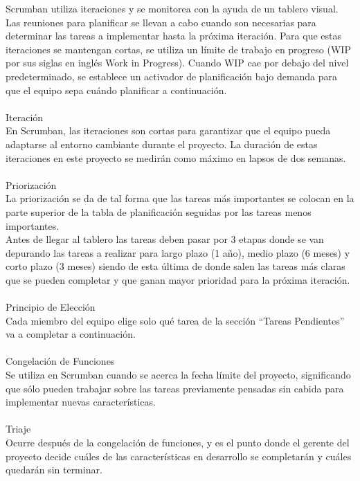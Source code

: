 \documentclass[12pt, a4paper, titlepage]{report}
\begin{document}
	    Scrumban utiliza iteraciones y se monitorea con la ayuda de un tablero visual. Las reuniones para planificar se llevan a cabo cuando son necesarias para determinar las tareas a implementar hasta la próxima iteración. Para que estas iteraciones se mantengan cortas, se utiliza un límite de trabajo en progreso (WIP por sus siglas en inglés Work in Progress). Cuando WIP cae por debajo del nivel predeterminado, se establece un activador de planificación bajo demanda para que el equipo sepa cuándo planificar a continuación.\\
	    \\
	    Iteración\\
	    En Scrumban, las iteraciones son cortas para garantizar que el equipo pueda adaptarse al entorno cambiante durante el proyecto. La duración de estas iteraciones en este proyecto se medirán como máximo en lapsos de dos semanas.\\
	    \\
	    Priorización\\
	    La priorización se da de tal forma que las tareas más importantes se colocan en la parte superior de la tabla de planificación seguidas por las tareas menos importantes.\\
	    Antes de llegar al tablero las tareas deben pasar por 3 etapas donde se van depurando las tareas a realizar para largo plazo (1 año), medio plazo (6 meses) y corto plazo (3 meses) siendo de esta última de donde salen las tareas más claras que se pueden completar y que ganan mayor prioridad para la próxima iteración.\\
	    \\
	    Principio de Elección\\
	    Cada miembro del equipo elige solo qué tarea de la sección “Tareas Pendientes” va a completar a continuación.\\
	    \\
	    Congelación de Funciones\\
	    Se utiliza en Scrumban cuando se acerca la fecha límite del proyecto, significando que sólo pueden trabajar sobre las tareas previamente pensadas sin cabida para implementar nuevas características.\\
	    \\
	    Triaje\\
	    Ocurre después de la congelación de funciones, y es el punto donde el gerente del proyecto decide cuáles de las características en desarrollo se completarán y cuáles quedarán sin terminar.\\
\end{document}
